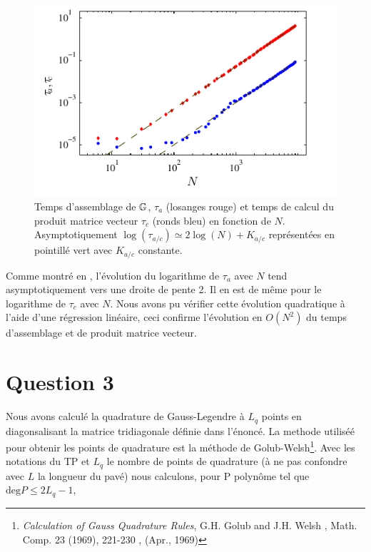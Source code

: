\documentclass[10pt]{article}
\begin{document}
\begin{multicols}{2}
\begin{figure}[H]
  \begin{center}
  \includegraphics[width=0.95\columnwidth]{Q2b_4.pdf}
  \vspace*{-11pt}
  \caption{Temps d'assemblage de $\mathbb{G}$, $\tau_a$ (losanges rouge) et temps de calcul du produit matrice vecteur $\tau_c$  (ronds bleu) en fonction de $N$. Asymptotiquement $\log(\tau_{a/c}) \simeq 2\log(N)+K_{a/c}$ représentées en pointillé vert avec $K_{a/c}$ constante.}
  \label{fig:Q2b} 
  \end{center}
\end{figure}
\vspace*{-20pt}

Comme montré en , l'évolution du logarithme de $\tau_a$ avec $N$ tend asymptotiquement vers une droite de pente 2. Il en est de même pour le logarithme de $\tau_c$ avec $N$. Nous avons pu vérifier cette évolution quadratique à l'aide d'une régression linéaire, ceci confirme l'évolution en $O(N^{2})$ du temps d'assemblage et de produit matrice vecteur.







\vspace*{22pt}

\section*{Question 3}

Nous avons calculé la quadrature de Gauss-Legendre à $L_q$ points en diagonsalisant la matrice tridiagonale définie dans l'énoncé. La methode utiliséé pour obtenir les points de quadrature est la méthode de Golub-Welsh\footnote{\textit{Calculation of Gauss Quadrature Rules}, G.H. Golub and J.H. Welsh \color{cyan}, Math. Comp. 23 (1969), 221-230 \color{black}, (Apr., 1969)}. Avec les notations du TP et $L_q$ le nombre de points de quadrature (à ne pas confondre avec $L$ la longueur du pavé) nous calculons, pour P polynôme tel que $\text{deg}P \le 2L_q-1$,


\end{multicols}
\end{document}
